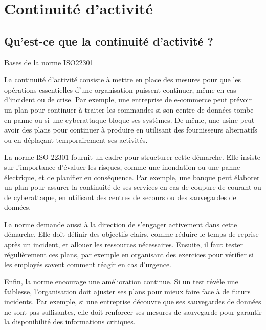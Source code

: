 
\section{Continuité d'activité}
\subsection{Qu’est-ce que la continuité d’activité ?}
Bases de la norme ISO22301

La continuité d’activité consiste à mettre en place des mesures pour que les opérations essentielles d’une organisation puissent continuer, même en cas d’incident ou de crise. Par exemple, une entreprise de e-commerce peut prévoir un plan pour continuer à traiter les commandes si son centre de données tombe en panne ou si une cyberattaque bloque ses systèmes. De même, une usine peut avoir des plans pour continuer à produire en utilisant des fournisseurs alternatifs ou en déplaçant temporairement ses activités.

La norme ISO 22301 fournit un cadre pour structurer cette démarche. Elle insiste sur l’importance d’évaluer les risques, comme une inondation ou une panne électrique, et de planifier en conséquence. Par exemple, une banque peut élaborer un plan pour assurer la continuité de ses services en cas de coupure de courant ou de cyberattaque, en utilisant des centres de secours ou des sauvegardes de données.

La norme demande aussi à la direction de s’engager activement dans cette démarche. Elle doit définir des objectifs clairs, comme réduire le temps de reprise après un incident, et allouer les ressources nécessaires. Ensuite, il faut tester régulièrement ces plans, par exemple en organisant des exercices pour vérifier si les employés savent comment réagir en cas d’urgence.

Enfin, la norme encourage une amélioration continue. Si un test révèle une faiblesse, l’organisation doit ajuster ses plans pour mieux faire face à de futurs incidents. Par exemple, si une entreprise découvre que ses sauvegardes de données ne sont pas suffisantes, elle doit renforcer ses mesures de sauvegarde pour garantir la disponibilité des informations critiques.

